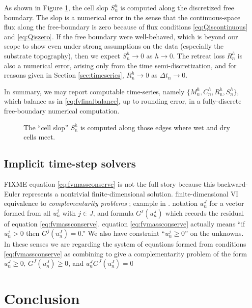 \documentclass[final,onefignum]{siamart190516}
\begin{document}
As shown in Figure \ref{fig:fvmesh-slop}, the cell slop $S_n^h$ is computed along the discretized free boundary.  The slop is a numerical error in the sense that the continuous-space flux along the free-boundary is zero because of flux conditions \eqref{eq:Qiscontinuous} and \eqref{eq:Qiszero}.  If the free boundary were well-behaved, which is beyond our scope to show even under strong assumptions on the data (especially the substrate topography), then we expect $S_n^h\to 0$ as $h\to 0$.  The retreat loss $R_n^h$ is also a numerical error, arising only from the time semi-discretization, and for reasons given in Section \ref{sec:timeseries}, $R_n^h \to 0$ as $\Delta t_n\to 0$.

In summary, we may report computable time-series, namely $\{M_n^h,C_n^h,R_n^h,S_n^h\}$, which balance as in \eqref{eq:fvfinalbalance}, up to rounding error, in a fully-discrete free-boundary numerical computation.

\begin{figure}[ht]
\begin{center}

\end{center}
\caption{The ``cell slop'' $S_n^h$ is computed along those edges where wet and dry cells meet.}
\label{fig:fvmesh-slop}
\end{figure}


\subsection{Implicit time-step solvers}  \label{subsec:implicitdiscrete}  

FIXME equation \eqref{eq:fvmassconserve} is not the full story because this backward-Euler represents a nontrivial finite-dimensional solution.  finite-dimensional VI equivalence to \emph{complementarity problems} \cite{BensonMunson2006,BillupsMurty2000}; example in \cite{Bueler2016}.  notation $u_n^J$ for a vector formed from all $u_n^j$ with $j\in J$, and formula $G^j(u_n^J)$ which records the residual of equation \eqref{eq:fvmassconserve}.  equation \eqref{eq:fvmassconserve} actually means ``if $u_n^j>0$ then $G^j(u_n^J)=0$.''  We also have constraint ``$u_n^j\ge 0$'' on the unknowns.  In these senses we are regarding the system of equations formed from conditions \eqref{eq:fvmassconserve} as combining to give a complementarity problem of the form $u_n^J\ge 0$, $G^J(u_n^J) \ge 0$, and $u_n^J G^J(u_n^J)=0$


\section{Conclusion} \label{sec:conclusion}
\end{document}
